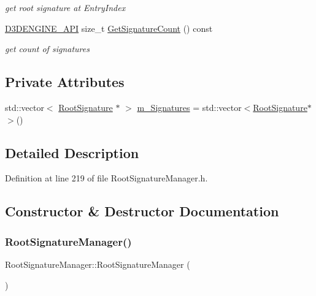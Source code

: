 \begin{DoxyCompactItemize}
\begin{DoxyCompactList}\small\item\em get root signature at Entry\+Index \end{DoxyCompactList}\item 
\mbox{\hyperlink{stdafx_8h_a8ee2d990c5dfba7794dd2b60741d7722}{D3\+D\+E\+N\+G\+I\+N\+E\+\_\+\+A\+PI}} size\+\_\+t \mbox{\hyperlink{class_root_signature_manager_abb1cf48c03d13e3b7a85fb0fe193dd36}{Get\+Signature\+Count}} () const
\begin{DoxyCompactList}\small\item\em get count of signatures \end{DoxyCompactList}\end{DoxyCompactItemize}
\subsection*{Private Attributes}
\begin{DoxyCompactItemize}
\item 
std\+::vector$<$ \mbox{\hyperlink{class_root_signature}{Root\+Signature}} $\ast$ $>$ \mbox{\hyperlink{class_root_signature_manager_a7d766443fb0a3ba77585fc0a08cfee07}{m\+\_\+\+Signatures}} = std\+::vector$<$\mbox{\hyperlink{class_root_signature}{Root\+Signature}}$\ast$$>$()
\end{DoxyCompactItemize}


\subsection{Detailed Description}


Definition at line 219 of file Root\+Signature\+Manager.\+h.



\subsection{Constructor \& Destructor Documentation}
\mbox{\label{class_root_signature_manager_a21d3c6836d4876126278a0a697261e8a}} 
\subsubsection{\texorpdfstring{Root\+Signature\+Manager()}{RootSignatureManager()}}
{\footnotesize\ttfamily Root\+Signature\+Manager\+::\+Root\+Signature\+Manager (\begin{DoxyParamCaption}{ }\end{DoxyParamCaption})}




